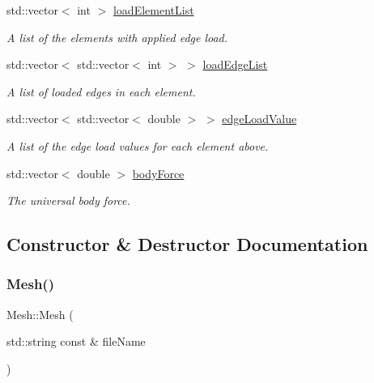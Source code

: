 \begin{DoxyCompactItemize}
\mbox{\label{class_mesh_a233cbdf434a8afb904b97ad803ae6daf}} 
std\+::vector$<$ int $>$ \mbox{\hyperlink{class_mesh_a233cbdf434a8afb904b97ad803ae6daf}{load\+Element\+List}}
\begin{DoxyCompactList}\small\item\em A list of the elements with applied edge load. \end{DoxyCompactList}\item 
\mbox{\label{class_mesh_a918281e8de6ff4f38e017c99a55fd8bf}} 
std\+::vector$<$ std\+::vector$<$ int $>$ $>$ \mbox{\hyperlink{class_mesh_a918281e8de6ff4f38e017c99a55fd8bf}{load\+Edge\+List}}
\begin{DoxyCompactList}\small\item\em A list of loaded edges in each element. \end{DoxyCompactList}\item 
\mbox{\label{class_mesh_aa94755c6ec3631b14f93a1ca48c5d366}} 
std\+::vector$<$ std\+::vector$<$ double $>$ $>$ \mbox{\hyperlink{class_mesh_aa94755c6ec3631b14f93a1ca48c5d366}{edge\+Load\+Value}}
\begin{DoxyCompactList}\small\item\em A list of the edge load values for each element above. \end{DoxyCompactList}\item 
\mbox{\label{class_mesh_a10891b16424fd1015868d2ef9a2c9311}} 
std\+::vector$<$ double $>$ \mbox{\hyperlink{class_mesh_a10891b16424fd1015868d2ef9a2c9311}{body\+Force}}
\begin{DoxyCompactList}\small\item\em The universal body force. \end{DoxyCompactList}\end{DoxyCompactItemize}


\subsection{Constructor \& Destructor Documentation}
\mbox{\label{class_mesh_af9ff79e2003cfde74b16266cd8113acf}} 
\subsubsection{\texorpdfstring{Mesh()}{Mesh()}}
{\footnotesize\ttfamily Mesh\+::\+Mesh (\begin{DoxyParamCaption}\item[{std\+::string const \&}]{file\+Name }\end{DoxyParamCaption})}



